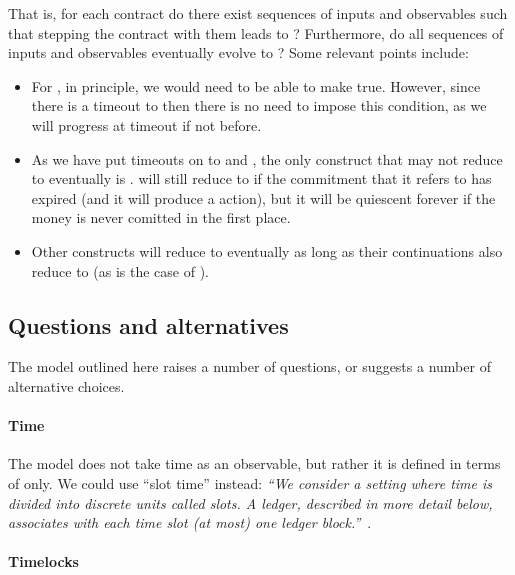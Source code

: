 \documentclass[runningheads]{llncs}
\begin{document}
That is, for each contract do there exist sequences of inputs and observables such that stepping the contract with them 
leads to ? Furthermore, do all sequences of inputs and observables eventually evolve to 
? Some relevant points include:
\begin{itemize}
\item For , in principle, we would need to be able to make  
true. However, since there is  a timeout to  then there is no need to impose this condition, as we 
will progress at timeout if not before.
\item As we have put timeouts on to  and , the only construct that may not 
reduce to  eventually is .  will still reduce to 
 if the commitment that it refers to has expired (and it will produce a 
 action), but it will be quiescent forever if the money is never comitted in the first 
place.
\item Other constructs will reduce to  eventually as long as their continuations also reduce to 
 (as is the case of ).
\end{itemize}

\subsection{Questions and alternatives}

The model outlined here raises a number of questions, or suggests a number of alternative choices.

\paragraph{Time}

The model does not take time as an observable, but rather it is defined in terms of  only. 
We could  use ``slot time'' instead: \emph{``We consider a setting where time is divided into discrete units called 
slots. A ledger, described in more detail below, associates with each time slot (at most) one ledger 
block.''}~\cite{Ouroboros}.

\paragraph{Timelocks}
\end{document}

